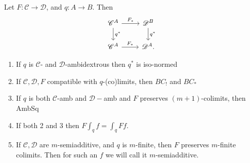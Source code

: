 Let $F: \mathscr{C} \to \mathscr{D}$, and $q: A \to B$. Then
\[ \begin{tikzcd}
    \mathscr{C}^A\rar["F_\ast"]\dar["q^\ast"] & \mathscr{D}^B\dar["q^\ast"]\\
    \mathscr{C}^A\rar["F_\ast"] & \mathscr{D}^A. 
\end{tikzcd} \]
\begin{enumerate}
    \item If $q$ is $\mathscr{C}$- and $\mathscr{D}$-ambidextrous then $q^\ast$ is iso-normed
    \item If $\mathscr{C},\mathscr{D},F$ compatible with $q$-(co)limits, then $BC_!$ and $BC_\ast$
    \item If $q$ is both $\mathscr{C}$-amb and $\mathscr{D}-$amb and $F$ preserves $(m+1)$-colimits, then AmbSq
    \item If both 2 and 3 then $F \int_q f = \int_q Ff$.
    \item If $\mathscr{C}, \mathscr{D}$ are $m$-semiadditive, and $q$ is $m$-finite, then $F$ preserves $m$-finite colimits. Then for such an $f$ we will call it $m$-semiadditive.
\end{enumerate}



